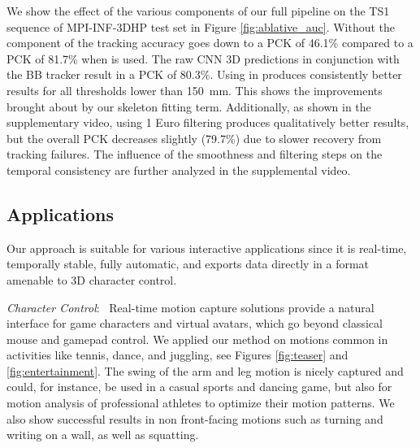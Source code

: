 \documentclass[acmtog]{acmart}
\newcommand{\parahead}[1]{\vspace{5pt}\noindent\emph{#1}:\ }
\newcommand{\change}[1]{{#1}}
\begin{document}
\change{We show the effect of the various components of our full pipeline on the TS1 sequence of MPI-INF-3DHP test set in Figure \ref{fig:ablative_auc}. Without the  component of  the tracking accuracy goes down to a PCK of 46.1\% compared to a PCK of 81.7\% when  is used. The raw CNN 3D predictions in conjunction with the BB tracker result in a PCK of 80.3\%. Using  in  produces consistently better results for all thresholds lower than 150~mm. This shows the improvements brought about by our skeleton fitting term. 
Additionally, as shown in the supplementary video, using 1 Euro filtering produces qualitatively better results, but the overall PCK decreases slightly (79.7\%) due to slower recovery from tracking failures. 
}
The influence of the smoothness and filtering steps on the temporal consistency are further analyzed in the supplemental video.

\subsection{Applications}
\label{sec:applications}
Our approach is suitable for various interactive applications since it is real-time, temporally stable, fully automatic, and exports data directly in a format amenable to 3D character control.

\parahead{Character Control}
Real-time motion capture solutions provide a natural interface
\change{for} game characters and virtual avatars, which go beyond classical mouse and gamepad control.
We applied our method on \change{motions common in activities like} tennis, dance, and juggling, see Figures \ref{fig:teaser} and \ref{fig:entertainment}.
The swing of the arm and leg motion is nicely captured and could, for instance, be used in a casual sports and dancing game, but also for motion analysis of professional athletes to optimize their motion patterns.
We also show successful results in non front-facing motions such as turning and writing on a wall, as well as squatting.
\end{document}
